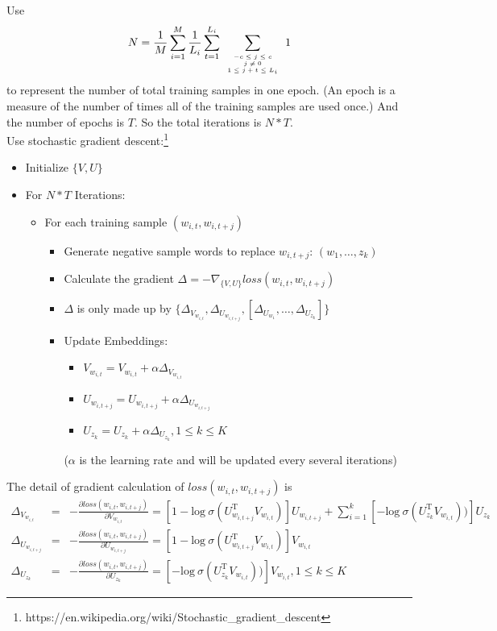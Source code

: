Use 
$$N = \frac{1}{M}\sum_{i=1}^M\frac{1}{L_i}\sum_{t=1}^{L_i}\sum\limits_{\mbox{\tiny$\begin{array}{c}-c\leq j \leq c\\ j\neq 0\\ 1\leq j+t\leq L_i\end{array}$}} 1$$
to represent the number of total training samples in one epoch. (An epoch is a measure of the number of times all of the training samples are used once.) And the number of epochs is $T$. So the total iterations is $N*T$.\\
	
Use stochastic gradient descent:\footnote{https://en.wikipedia.org/wiki/Stochastic\_gradient\_descent} 
	\begin{itemize}
	\item Initialize $\{V,U\}$
	\item For $N*T$ Iterations: 
		\begin{itemize}
		\item For each training sample $(w_{i,t},w_{i,{t+j}})$
		\begin{itemize}
		\item Generate negative sample words to replace $w_{i,t+j}$: $(w_1,\ldots,z_k)$
		\item Calculate the gradient $\Delta = -\nabla_{\{V,U\}} loss(w_{i,t},w_{i,{t+j}})$
		\item $\Delta$ is only made up by $\{\Delta_{V_{w_{i,t}}}, \Delta_{U_{w_{i,t+j}}}, [\Delta_{U_{w_1}},\ldots,\Delta_{U_{z_k}}]\}$
		\item Update Embeddings: 
		\begin{itemize}
		\item $V_{w_{i,t}} = V_{w_{i,t}}+\alpha\Delta_{V_{w_{i,t}}}$
		\item $U_{w_{i,t+j}} = U_{w_{i,t+j}}+\alpha\Delta_{U_{w_{i,t+j}}}$
		\item $U_{z_k} = U_{z_k}+\alpha\Delta_{U_{z_k}}, 1\leq k\leq K$ 
		\end{itemize}
		($\alpha$ is the learning rate and will be updated every several iterations)
		\end{itemize}
		\end{itemize}
	\end{itemize}
The detail of gradient calculation of $loss(w_{i,t},w_{i,t+j})$ is
\begin{eqnarray*}
	\Delta_{V_{w_{i,t}}} &=& -\frac{\partial loss(w_{i,t},w_{i,t+j})}{\partial V_{w_{i,t}}} = [1-\mathrm{log}\ \sigma(U_{w_{i,t+j}}^{\mathrm{T}}V_{w_{i,t}})]U_{w_{i,t+j}}+\sum_{i=1}^k [-\mathrm{log}\ \sigma(U_{z_k}^{\mathrm{T}}V_{w_{i,t}}))]U_{z_k}\\
	\Delta_{U_{w_{i,t+j}}} &=& -\frac{\partial loss(w_{i,t},w_{i,t+j})}{\partial U_{w_{i,t+j}}} = [1-\mathrm{log}\ \sigma(U_{w_{i,t+j}}^{\mathrm{T}}V_{w_{i,t}})]V_{w_{i,t}}\\
	\Delta_{U_{z_k}} &=& -\frac{\partial loss(w_{i,t},w_{i,t+j})}{\partial U_{z_k}} = [-\mathrm{log}\ \sigma(U_{z_k}^{\mathrm{T}}V_{w_{i,t}}))]V_{w_{i,t}}, 1\leq k\leq K
\end{eqnarray*}
